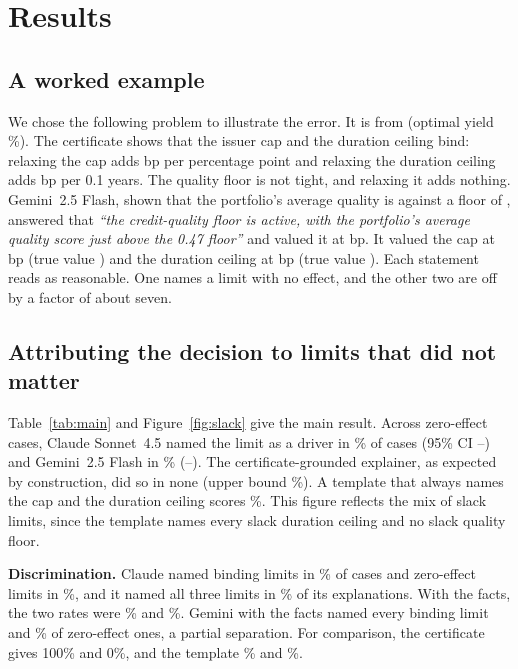 \section{Results}
\label{sec:results}

\subsection{A worked example}
We chose the following problem to illustrate the error. It is from \exDate{}
(optimal yield \exObj\%). The certificate shows that the issuer cap and the
duration ceiling bind: relaxing the cap adds \exCapTrue{} bp per percentage point
and relaxing the duration ceiling adds \exDurTrue{} bp per 0.1 years. The quality
floor is not tight, and relaxing it adds nothing. Gemini~2.5 Flash, shown that
the portfolio's average quality is \exAvgQ{} against a floor of \exQFloor{},
answered that \emph{``the credit-quality floor is active, with the portfolio's
average quality score just above the 0.47 floor''} and valued it at
\exQualClaim{} bp. It valued the cap at \exCapClaim{} bp (true value \exCapTrue)
and the duration ceiling at \exDurClaim{} bp (true value \exDurTrue). Each
statement reads as reasonable. One names a limit with no effect, and the other
two are off by a factor of about seven.

\subsection{Attributing the decision to limits that did not matter}
Table~\ref{tab:main} and Figure~\ref{fig:slack} give the main result. Across
\nSlackCases{} zero-effect cases, Claude Sonnet~4.5 named the limit as a driver
in \snSonFf\% of cases (95\% CI \snSonFfLo--\snSonFfHi) and Gemini~2.5 Flash in
\snGemFf\% (\snGemFfLo--\snGemFfHi). The certificate-grounded explainer, as
expected by construction, did so in none (upper bound \snCGHi\%). A template
that always names the cap and the duration ceiling scores \snTmpl\%. This figure
reflects the mix of slack limits, since the template names every slack duration
ceiling and no slack quality floor.

\textbf{Discrimination.} Claude named binding limits in \bindSonFf\% of cases and
zero-effect limits in \snSonFf\%, and it named all three limits in
\allthreeSonFf\% of its explanations. With the facts, the two rates were
\bindSonInf\% and \snSonInf\%. Gemini with the facts named every binding limit
and \snGemInf\% of zero-effect ones, a partial separation. For comparison, the
certificate gives 100\% and 0\%, and the template \bindTmpl\% and \snTmpl\%.


